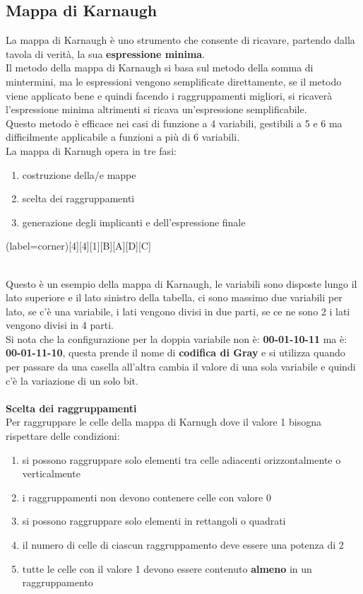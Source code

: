 \documentclass[12pt]{report}
\begin{document}
				\subsection{Mappa di Karnaugh}
				La mappa di Karnaugh è uno strumento che consente di ricavare, partendo dalla tavola di verità, la sua \textbf{espressione minima}. \\
				Il metodo della mappa di Karnaugh si basa sul metodo della somma di mintermini, ma le espressioni vengono semplificate direttamente, se il metodo viene applicato bene e quindi facendo i raggruppamenti migliori, si ricaverà l'espressione minima altrimenti si ricava un'espressione semplificabile. \\
				Questo metodo è efficace nei casi di funzione a 4 variabili, gestibili a 5 e 6 ma difficilmente applicabile a funzioni a più di 6 variabili. \\
				La mappa di Karnugh opera in tre fasi:
				\begin{enumerate}
					\item costruzione della/e mappe
					\item scelta dei raggruppamenti
					\item generazione degli implicanti e dell'espressione finale
				\end{enumerate}
				\begin{karnaugh-map}(label=corner)[4][4][1][B][A][D][C]

				\end{karnaugh-map} \\
				Questo è un esempio della mappa di Karnaugh, le variabili sono disposte lungo il lato superiore e il lato sinistro della tabella, ci sono massimo due variabili per lato, se c'è una variabile, i lati vengono divisi in due parti, se ce ne sono 2 i lati vengono divisi in 4 parti.
				\\
				Si nota che la configurazione per la doppia variabile non è: \textbf{00-01-10-11} ma è: \textbf{00-01-11-10}, questa prende il nome di \textbf{codifica di Gray} e si utilizza quando per passare da una casella all'altra cambia il valore di una sola variabile e quindi c'è la variazione di un solo bit.
				\\ \\
				\textbf{\color{red}Scelta dei raggruppamenti} \\
				Per raggruppare le celle della mappa di Karnugh dove il valore 1 bisogna rispettare delle condizioni:
				\begin{enumerate}
					\item si possono raggruppare solo elementi tra celle adiacenti orizzontalmente o verticalmente
					\item i raggruppamenti non devono contenere celle con valore 0
					\item si possono raggruppare solo elementi in rettangoli o quadrati
					\item il numero di celle di ciascun raggruppamento deve essere una potenza di 2
					\item tutte le celle con il valore 1 devono essere contenuto \textbf{almeno} in un raggruppamento
				\end{enumerate}
\end{document}
